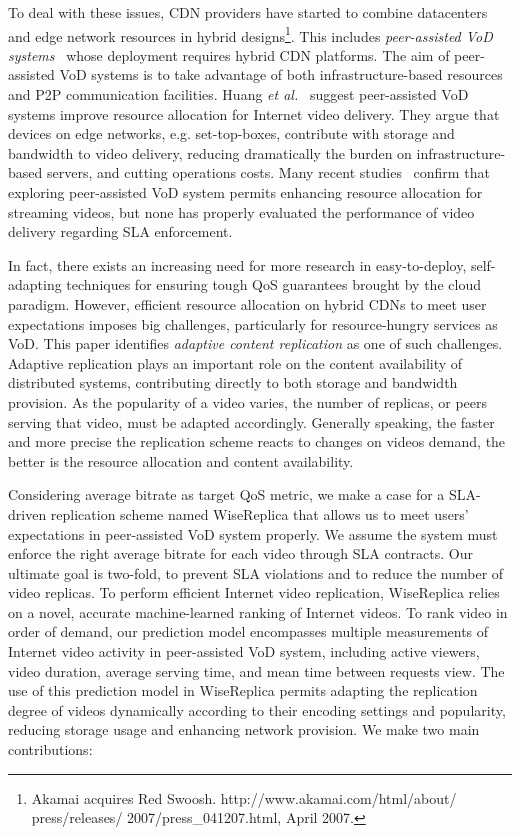 To deal with these issues, CDN providers have started to combine datacenters and edge network resources in hybrid designs\footnote{Akamai acquires Red Swoosh. http://www.akamai.com/html/about/ press/releases/ 2007/press\_041207.html, April 2007.}. This includes \emph{peer-assisted VoD systems}~\cite{profitable_vod_sigcomm_07} whose deployment requires hybrid CDN platforms. The aim of peer-assisted VoD systems is to take advantage of both infrastructure-based resources and P2P communication facilities. Huang \emph{et al.}~\cite{profitable_vod_sigcomm_07} suggest peer-assisted VoD systems improve resource allocation for Internet video delivery. They argue that devices on edge networks, e.g. set-top-boxes, contribute with storage and bandwidth to video delivery, reducing dramatically the burden on infrastructure-based servers, and cutting operations costs. Many recent studies~\cite{parvez_bittorrent_analysis_sigmetrics08,huang2008challenges_sigcomm08,pavod_icnp12} confirm that exploring peer-assisted VoD system permits enhancing resource allocation for streaming videos, but none has properly evaluated the performance of video delivery regarding SLA enforcement. 

In fact, there exists an increasing need for more research in easy-to-deploy, self-adapting techniques for ensuring tough QoS guarantees brought by the cloud paradigm. However, efficient resource allocation on hybrid CDNs to meet user expectations imposes big challenges, particularly for resource-hungry services as VoD. 
This paper identifies \emph{adaptive content replication} as one of such challenges. Adaptive replication plays an important role on the content availability of distributed systems, contributing directly to both storage and bandwidth provision. As the popularity of a video varies, the number of replicas, or peers serving that video, must be adapted accordingly. Generally speaking, the faster and more precise the replication scheme reacts to changes on videos demand, the better is the resource allocation and content availability. 

Considering average bitrate as target QoS metric, we make a case for a SLA-driven replication scheme named WiseReplica that allows us to meet users' expectations in peer-assisted VoD system properly. We assume the system must enforce the right average bitrate for each video through SLA contracts. Our ultimate goal is two-fold, to prevent SLA violations and to reduce the number of video replicas. To perform efficient Internet video replication, WiseReplica relies on a novel, accurate machine-learned ranking of Internet videos. To rank video in order of demand,  our prediction model encompasses multiple measurements of Internet video activity in peer-assisted VoD system, including active viewers, video duration, average serving time, and mean time between requests view. The use of this prediction model in WiseReplica permits adapting the replication degree of videos dynamically according to their encoding settings and popularity, reducing storage usage and enhancing network provision.  We make two main contributions:

